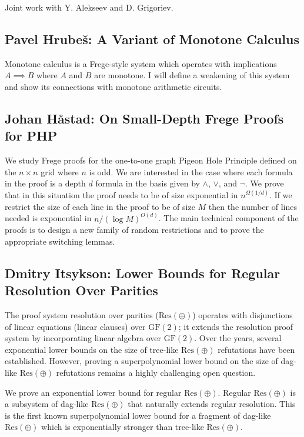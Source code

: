 \documentclass[11pt]{article}
\begin{document}
Joint work with Y. Alekseev and D. Grigoriev.
\subsection*{Pavel Hrube\v{s}: A Variant of Monotone Calculus}\label{Hrubes}

Monotone calculus is a Frege-style system which operates with implications $A\implies B$ where $A$ and $B$ are monotone. I will define a weakening of this system and show its connections with monotone arithmetic circuits.


\subsection*{Johan H\aa stad: On Small-Depth Frege Proofs for PHP}\label{Hastad}

We study Frege proofs for the one-to-one graph Pigeon Hole Principle
defined on the $n\times n$ grid where $n$ is odd.
We are interested in the case where each formula
in the proof is a depth $d$ formula in the basis given by
$\land$, $\lor$, and $\neg$. We prove that in this situation the
proof needs to be of size exponential in $n^{\Omega (1/d)}$.
If we restrict the size of each line in the proof to be of
size $M$ then the number of lines needed is exponential
in $n/(\log M)^{O(d)}$.   The main technical component of
the proofs is to design a new family of random restrictions
and to prove the appropriate switching lemmas.

\subsection*{Dmitry Itsykson: Lower Bounds for Regular Resolution Over Parities}\label{Itsykson}

The proof system resolution over parities ($\mathrm{Res}(\oplus)$) operates with disjunctions of linear equations (linear clauses) over $\mathrm{GF}(2)$; it extends the resolution proof system by incorporating linear algebra over $\mathrm{GF}(2)$. Over the years, several exponential lower bounds on the size of tree-like $\mathrm{Res}(\oplus)$ refutations have been established. However, proving a superpolynomial lower bound on the size of dag-like $\mathrm{Res}(\oplus)$ refutations remains a highly challenging open question.

We prove an exponential lower bound for regular $\mathrm{Res}(\oplus)$. Regular $\mathrm{Res}(\oplus)$ is a subsystem of dag-like $\mathrm{Res}(\oplus)$ that naturally extends regular resolution. This is the first known superpolynomial lower bound for a fragment of dag-like $\mathrm{Res}(\oplus)$ which is exponentially stronger than tree-like $\mathrm{Res}(\oplus)$.
\end{document}
